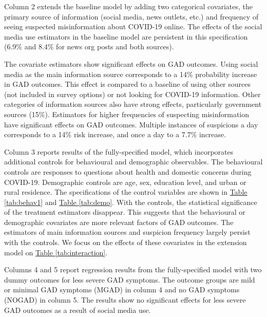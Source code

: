\documentclass{article}[12pt]
\begin{document}
        Column 2 extends the baseline model by adding two categorical covariates, the primary source of information (social media, news outlets, etc.) and frequency of seeing suspected misinformation about COVID-19 online. The effects of the social media use estimators in the baseline model are persistent in this specification (6.9\% and 8.4\% for news org posts and both sources).
        
        The covariate estimators show significant effects on GAD outcomes. Using social media as the main information source corresponds to a 14\% probability increase in GAD outcomes. This effect is compared to a baseline of using other sources (not included in survey options) or not looking for COVID-19 information. Other categories of information sources also have strong effects, particularly government sources (15\%). Estimators for higher frequencies of suspecting misinformation have significant effects on GAD outcomes. Multiple instances of suspicions a day corresponds to a 14\% risk increase, and once a day to a 7.7\% increase.
        
        Column 3 reports results of the fully-specified model, which incorporates additional controls for behavioural and demographic observables. The behavioural controls are responses to questions about health and domestic concerns during COVID-19. Demographic controls are age, sex, education level, and urban or rural residence. The specifications of the control variables are shown in \hyperref[tab:behav2]{Table \ref*{tab:behav1}} and \hyperref[tab:demo]{Table \ref*{tab:demo}}. With the controls, the statistical significance of the treatment estimators disappear. This suggests that the behavioural or demographic covariates are more relevant factors of GAD outcomes. The estimators of main information sources and suspicion frequency largely persist with the controls. We focus on the effects of these covariates in the extension model on \hyperref[tab:interaction]{Table \ref{tab:interaction}}.
        
        Columns 4 and 5 report regression results from the fully-specified model with two dummy outcomes for less severe GAD symptoms. The outcome groups are mild or minimal GAD symptoms (MGAD) in column 4 and no GAD symptoms (NOGAD) in column 5. The results show no significant effects for less severe GAD outcomes as a result of social media use.
        
\end{document}
